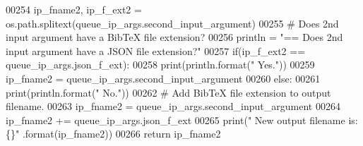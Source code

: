 \begin{DoxyCode}
00254         ip\_fname2, ip\_f\_ext2 = os.path.splitext(queue\_ip\_args.second\_input\_argument)
00255         \textcolor{comment}{#   Does 2nd input argument have a BibTeX file extension?}
00256         println = \textcolor{stringliteral}{"==   Does 2nd input argument have a JSON file extension?"}
00257         if(ip\_f\_ext2 == queue\_ip\_args.json\_f\_ext):
00258             print(println.format(\textcolor{stringliteral}{"  Yes."}))
00259             ip\_fname2 = queue\_ip\_args.second\_input\_argument
00260         \textcolor{keywordflow}{else}:
00261             print(println.format(\textcolor{stringliteral}{"  No."}))
00262             \textcolor{comment}{#   Add BibTeX file extension to output filename.}
00263             ip\_fname2 = queue\_ip\_args.second\_input\_argument
00264             ip\_fname2 += queue\_ip\_args.json\_f\_ext
00265             print(\textcolor{stringliteral}{" New output filename is: \{\}"} .format(ip\_fname2))
00266         \textcolor{keywordflow}{return} ip\_fname2
\end{DoxyCode}
